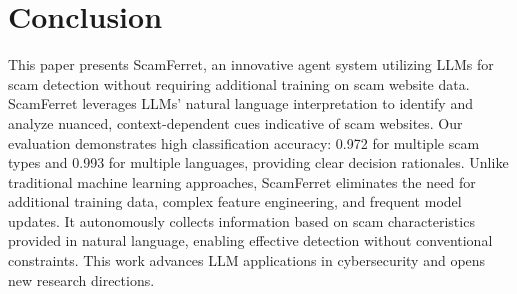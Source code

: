 \documentclass[runningheads]{llncs}
\begin{document}
\section{Conclusion}
\label{sec:conclusion}
This paper presents ScamFerret, an innovative agent system utilizing LLMs for scam detection without requiring additional training on scam website data.
ScamFerret leverages LLMs' natural language interpretation to identify and analyze nuanced, context-dependent cues indicative of scam websites.
Our evaluation demonstrates high classification accuracy: 0.972 for multiple scam types and 0.993 for multiple languages, providing clear decision rationales.
Unlike traditional machine learning approaches, ScamFerret eliminates the need for additional training data, complex feature engineering, and frequent model updates.
It autonomously collects information based on scam characteristics provided in natural language, enabling effective detection without conventional constraints.
This work advances LLM applications in cybersecurity and opens new research directions.





\appendix
\end{document}
